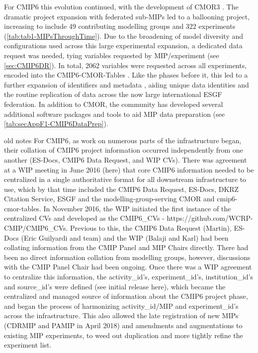 \documentclass[manuscript]{copernicus}
\begin{document}
{For CMIP6 this evolution continued, with the development of CMOR3 \citep{mauzey_cmor_2024}. The dramatic project expansion with federated sub-MIPs led to a ballooning project, increasing to include 49 contributing modelling groups and 322 experiments (\autoref{tab:tab1-MIPsThroughTime}). Due to the broadening of model diversity and configurations used across this large experimental expansion, a dedicated data request was needed, tying variables requested by MIP/experiment (see \autoref{sec:CMIP6DR}). In total, 2062 variables were requested across all experiments, encoded into the CMIP6-CMOR-Tables \citep{nadeau_cmip6_2017}. Like the phases before it, this led to a further expansion of identifiers and metadata \citep{taylor_pcmdi_2018}, aiding unique data identities and the routine replication of data across the now large international ESGF federation. In addition to CMOR, the community has developed several additional software packages and tools to aid MIP data preparation (see \autoref{tab:secAppF1-CMIP6DataPrep}).

old notes
For CMIP6, as work on numerous parts of the infrastructure began, their collation of CMIP6 project information occurred independently from one another (ES-Docs, CMIP6 Data Request, and WIP CVs). There was agreement at a WIP meeting in June 2016 (here) that core CMIP6 information needed to be centralized in a single authoritative format for all downstream infrastructure to use, which by that time included the CMIP6 Data Request, ES-Docs, DKRZ Citation Service, ESGF and the modelling-group-serving CMOR and cmip6-cmor-tables. In November 2016, the WIP initiated the first instance of the centralized CVs and developed as the CMIP6_CVs - https://github.com/WCRP-CMIP/CMIP6_CVs. Previous to this, the CMIP6 Data Request (Martin), ES-Docs (Eric Guilyardi and team) and the WIP (Balaji and Karl) had been collating information from the CMIP Panel and MIP Chairs directly. There had been no direct information collation from modelling groups, however, discussions with the CMIP Panel Chair had been ongoing. Once there was a WIP agreement to centralize this information, the activity_id’s, experiment_id’s, institution_id’s and source_id’s were defined (see initial release here), which became the centralized and managed source of information about the CMIP6 project phase, and began the process of harmonizing activity_id/MIP and experiment_id’s across the infrastructure. This also allowed the late registration of new MIPs (CDRMIP and PAMIP in April 2018) and amendments and augmentations to existing MIP experiments, to weed out duplication and more tightly refine the experiment list.

}
\end{document}
